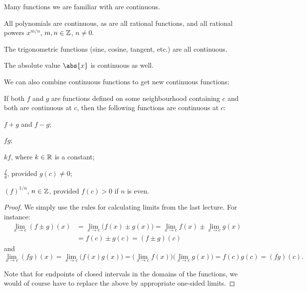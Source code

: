 
Many functions we are familiar with are continuous.

\begin{examples}
	All polynomials are continuous, as are all rational functions, and all rational powers $x^{m/n}$, $m, n \in \mathbb{Z}$, $n \neq 0$.

	The trigonometric functions (sine, cosine, tangent, etc.) are all continuous.

	The absolute value $\abs{x}$ is continuous as well.
\end{examples}

\noindent
We can also combine continuous functions to get new continuous functions:

\begin{theorem}
	If both $f$ and $g$ are functions defined on some neighbourhood containing $c$ and both are continuous at $c$, then the following functions are continuous at $c$:
	\begin{romanlist}
		\item $f + g$ and $f - g$;
		\item $fg$;
		\item $k f$, where $k \in \mathbb{R}$ is a constant;
		\item $\displaystyle \frac{f}{g}$, provided $g(c) \neq 0$;
		\item $(f)^{1 / n}$, $n \in \mathbb{Z}$, provided $f(c) > 0$ if $n$ is even.
	\end{romanlist}
\end{theorem}

\begin{proof}
	We simply use the rules for calculating limits from the last lecture. For instance:
	\begin{align*}
		\lim_{x \to c} (f \pm g)(x) & = \lim_{x \to c} \big ( f(x) \pm g(x) \big ) = \lim_{x \to c} f(x) \pm \lim_{x \to c} g(x) \\
		                            & = f(c) \pm g(c) = (f \pm g)(c)
	\end{align*}
	and
	\[
		\lim_{x \to c} (fg)(x) = \lim_{x \to c} \big ( f(x)g(x) \big ) = \big ( \lim_{x \to c} f(x) \big ) \big ( \lim_{x \to c} g(x) \big ) = f(c) g(c) = (fg)(c).
	\]

	\noindent
	Note that for endpoints of closed intervals in the domains of the functions, we would of course have to replace the above by appropriate one-sided limits.
\end{proof}

